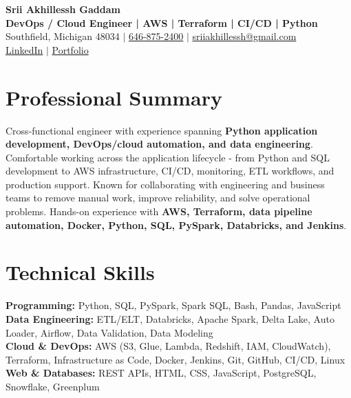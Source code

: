 \documentclass[letterpaper,10pt]{article}
\begin{document}
\fontsize{9.35pt}{10.45pt}\selectfont

\begin{center}
    {\LARGE \textbf{Srii Akhillessh Gaddam}} \\[-1pt]
    \textbf{DevOps / Cloud Engineer | AWS | Terraform | CI/CD | Python} \\[2pt]
    Southfield, Michigan 48034 $|$
    \href{tel:6468752400}{646-875-2400} $|$
    \href{mailto:sriiakhillessh@gmail.com}{sriiakhillessh@gmail.com} \\[1pt]
    \href{https://www.linkedin.com/in/srii-akhiilessh-gaddam-b48668191/}{LinkedIn} $|$
    \href{https://sriiakhillesshg.github.io/portfolio/}{Portfolio}
\end{center}
\vspace{-8pt}

\section{Professional Summary}
\small{Cross-functional engineer with experience spanning \textbf{Python application development, DevOps/cloud automation, and data engineering}. Comfortable working across the application lifecycle - from Python and SQL development to AWS infrastructure, CI/CD, monitoring, ETL workflows, and production support. Known for collaborating with engineering and business teams to remove manual work, improve reliability, and solve operational problems. Hands-on experience with \textbf{AWS, Terraform, data pipeline automation, Docker, Python, SQL, PySpark, Databricks, and Jenkins}.}

\section{Technical Skills}
\small{
\textbf{Programming:} Python, SQL, PySpark, Spark SQL, Bash, Pandas, JavaScript \\
\textbf{Data Engineering:} ETL/ELT, Databricks, Apache Spark, Delta Lake, Auto Loader, Airflow, Data Validation, Data Modeling \\
\textbf{Cloud \& DevOps:} AWS (S3, Glue, Lambda, Redshift, IAM, CloudWatch), Terraform, Infrastructure as Code, Docker, Jenkins, Git, GitHub, CI/CD, Linux \\
\textbf{Web \& Databases:} REST APIs, HTML, CSS, JavaScript, PostgreSQL, Snowflake, Greenplum
}
\end{document}
